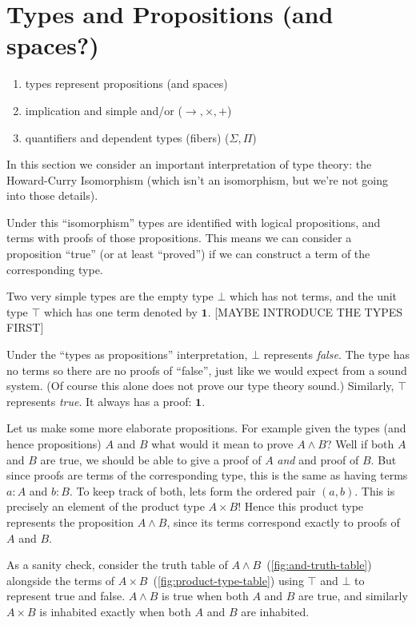 \section{Types and Propositions (and spaces?)}
\begin{enumerate}
  \item types represent propositions (and spaces)
  \item implication and simple and/or ($\rightarrow, \times, +$)
  \item quantifiers and dependent types (fibers) ($\Sigma, \Pi$)
\end{enumerate}

In this section we consider an important interpretation of type theory: the
Howard-Curry Isomorphism (which isn't an isomorphism, but we're not going into
those details).

Under this ``isomorphism'' types are identified with logical propositions, and
terms with proofs of those propositions. This means we can consider a
proposition ``true'' (or at least ``proved'') if we can construct a term of the
corresponding type.

Two very simple types are the empty type $\bot$ which has not terms, and the
unit type $\top$ which has one term denoted by $\mathbf{1}$. [MAYBE INTRODUCE
THE TYPES FIRST]

Under the ``types as propositions'' interpretation, $\bot$ represents
\emph{false}. The type has no terms so there are no proofs of ``false'', just
like we would expect from a sound system. (Of course this alone does not prove
our type theory sound.) Similarly, $\top$ represents \emph{true}. It always has
a proof: $\mathbf{1}$.

Let us make some more elaborate propositions. For example given the types (and
hence propositions) $A$ and $B$ what would it mean to prove $A \land B$? Well if
both $A$ and $B$ are true, we should be able to give a proof of $A$ \emph{and}
and proof of $B$. But since proofs are terms of the corresponding type, this is
the same as having terms $a : A$ and $b : B$. To keep track of both, lets form
the ordered pair $(a, b)$. This is precisely an element of the product type $A
\times B$! Hence this product type represents the proposition $A \land B$, since
its terms correspond exactly to proofs of $A$ and $B$.

As a sanity check, consider the truth table of $A \land B$~(\autoref{fig:and-truth-table}) alongside the terms of $A
\times B$~(\autoref{fig:product-type-table}) using $\top$ and $\bot$ to represent true and false. $A \land B$ is
true when both $A$ and $B$ are true, and similarly $A \times B$ is inhabited
exactly when both $A$ and $B$ are inhabited.

